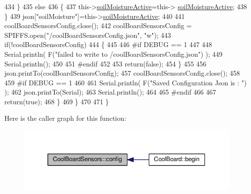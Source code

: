\begin{DoxyCode}
434             \}
435             \textcolor{keywordflow}{else}
436             \{
437                 this->\hyperlink{classCoolBoardSensors_a31983eecc0f9cd000e1f912206ea4dc8}{soilMoistureActive}=this->
      \hyperlink{classCoolBoardSensors_a31983eecc0f9cd000e1f912206ea4dc8}{soilMoistureActive};
438             \}
439             json[\textcolor{stringliteral}{"soilMoisture"}]=this->\hyperlink{classCoolBoardSensors_a31983eecc0f9cd000e1f912206ea4dc8}{soilMoistureActive};
440 
441             coolBoardSensorsConfig.close();         
442             coolBoardSensorsConfig = SPIFFS.open(\textcolor{stringliteral}{"/coolBoardSensorsConfig.json"}, \textcolor{stringliteral}{"w"});          
443             \textcolor{keywordflow}{if}(!coolBoardSensorsConfig)
444             \{
445             
446 \textcolor{preprocessor}{            #if DEBUG == 1}
447 
448                 Serial.println( F(\textcolor{stringliteral}{"failed to write to /coolBoardSensorsConfig.json"}) );
449                 Serial.println();
450             
451 \textcolor{preprocessor}{            #endif}
452 
453                 \textcolor{keywordflow}{return}(\textcolor{keyword}{false});          
454             \}  
455 
456             json.printTo(coolBoardSensorsConfig);
457             coolBoardSensorsConfig.close();         
458             
459 \textcolor{preprocessor}{        #if DEBUG == 1}
460 
461             Serial.println( F(\textcolor{stringliteral}{"Saved Configuration Json is : "}) );
462             json.printTo(Serial);
463             Serial.println();
464         
465 \textcolor{preprocessor}{        #endif}
466 
467             \textcolor{keywordflow}{return}(\textcolor{keyword}{true}); 
468         \}
469     \}   
470 
471 \}
\end{DoxyCode}
Here is the caller graph for this function\+:
\nopagebreak
\begin{figure}[H]
\begin{center}
\leavevmode
\includegraphics[width=339pt]{classCoolBoardSensors_a9a218895c5423375c33c08f2c56fb23a_icgraph}
\end{center}
\end{figure}
\mbox{\label{classCoolBoardSensors_a4902b69f6e628bd6557193758fdd2bae}} 
